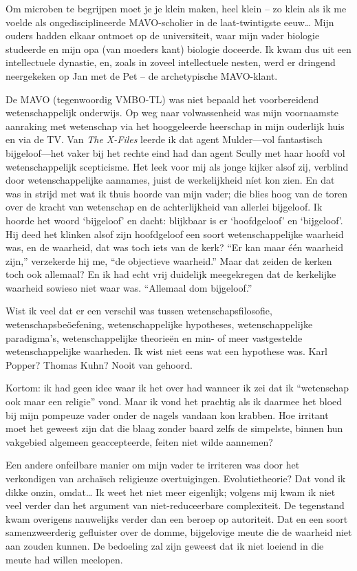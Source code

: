 \documentclass[12pt,a4paper]{article}
\begin{document}
Om microben te begrijpen moet je je klein maken, heel klein – zo klein als ik me voelde als ongedisciplineerde MAVO-scholier in de laat-twintigste eeuw…  Mijn ouders hadden elkaar ontmoet op de universiteit, waar mijn vader biologie studeerde en mijn opa (van moeders kant) biologie doceerde. Ik kwam dus uit een intellectuele dynastie, en, zoals in zoveel intellectuele nesten, werd er dringend neergekeken op Jan met de Pet – de archetypische MAVO-klant.

De MAVO (tegenwoordig VMBO-TL) was niet bepaald het voorbereidend wetenschappelijk onderwijs. Op weg naar volwassenheid was mijn voornaamste aanraking met wetenschap via het hooggeleerde heerschap in mijn ouderlijk huis en via de TV. Van \emph{The X-Files} leerde ik dat agent Mulder—vol fantastisch bijgeloof—het vaker bij het rechte eind had dan agent Scully met haar hoofd vol wetenschappelijk scepticisme. Het leek voor mij als jonge kijker alsof zij, verblind door wetenschappelijke aannames, juist de werkelijkheid níet kon zien. En dat was in strijd met wat ik thuis hoorde van mijn vader; die blies hoog van de toren over de kracht van wetenschap en de achterlijkheid van allerlei bijgeloof. Ik hoorde het woord ‘bijgeloof’ en dacht: blijkbaar is er ‘hoofdgeloof’ en ‘bijgeloof’. Hij deed het klinken alsof zijn hoofdgeloof een soort wetenschappelijke waarheid was, en de waarheid, dat was toch iets van de kerk? “Er kan maar één waarheid zijn,” verzekerde hij me, “de objectieve waarheid.” Maar dat zeiden de kerken toch ook allemaal? En ik had echt vrij duidelijk meegekregen dat de kerkelijke waarheid sowieso niet waar was. “Allemaal dom bijgeloof.”

Wist ik veel dat er een verschil was tussen wetenschapsfilosofie, weten\-schaps\-beöef\-ening, wetenschappelijke hypotheses, wetenschappelijke paradigma's, wetenschappelijke theorieën en min- of meer vastgestelde wetenschappelijke waarheden. Ik wist niet eens wat een hypothese was. Karl Popper? Thomas Kuhn? Nooit van gehoord.

Kortom: ik had geen idee waar ik het over had wanneer ik zei dat ik “wetenschap ook maar een religie” vond. Maar ik vond het prachtig als ik daarmee het bloed bij mijn pompeuze vader onder de nagels vandaan kon krabben. Hoe irritant moet het geweest zijn dat die blaag zonder baard zelfs de simpelste, binnen hun vakgebied algemeen geaccepteerde, feiten niet wilde aannemen?

Een andere onfeilbare manier om mijn vader te irriteren was door het verkondigen van archaïsch religieuze overtuigingen. Evolutietheorie? Dat vond ik dikke onzin, omdat… Ik weet het niet meer eigenlijk; volgens mij kwam ik niet veel verder dan het argument van niet-reduceerbare complexiteit. De tegenstand kwam overigens nauwelijks verder dan een beroep op autoriteit. Dat en een soort samenzweerderig gefluister over de domme, bijgelovige meute die de waarheid niet aan zouden kunnen. De bedoeling zal zijn geweest dat ik niet loeiend in die meute had willen meelopen.
\end{document}
